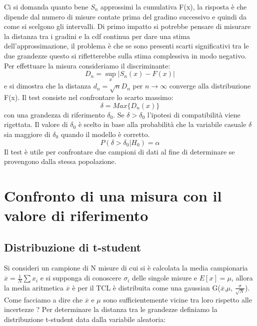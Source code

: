 \documentclass[11pt,a4paper]{book}
\begin{document}
Ci si domanda quanto bene $S_n$ approssimi la cumulativa F(x), la risposta \`{e} che dipende dal numero di misure contate prima del gradino successivo e quindi da come si scelgono gli intervalli. Di primo impatto si potrebbe pensare di misurare la distanza tra i gradini e la cdf continua per dare una stima dell'approssimazione, il problema \`{e} che se sono presenti scarti significativi tra le due grandezze questo si rifletterebbe sulla stima complessiva in modo negativo. Per effettuare la misura consideriamo il discriminante:
\begin{equation*}
	D_n = \sup_{x} \vert S_n(x) -F(x) \vert 
\end{equation*}
 e si dimostra che la distanza $d_n = \sqrt{n}D_n$ per $n \rightarrow \infty$ converge alla distribuzione F(x).
 Il test consiste nel confrontare lo scarto massimo:
 \begin{equation*}
 	\delta = Max \{D_n(x)\}
 \end{equation*}
 con una grandezza di riferimento $\delta_0$. Se $\delta > \delta_0$ l'ipotesi di compatibilit\`{a} viene rigettata. Il valore di $\delta_0$ \`{e} scelto in base alla probabilit\`{a} che la variabile casuale $\delta$ sia maggiore di $\delta_0$ quando il modello \`{e} corretto.
 \begin{equation*}
 	P(\delta > \delta_0 \vert H_0) = \alpha
 \end{equation*}
 Il test \`{e} utile per confrontare due campioni di dati al fine di determinare se provengono dalla stessa popolazione.
 
 \section{Confronto di una misura con il valore di riferimento}
 \subsection{Distribuzione di t-student}
 Si consideri un campione di N misure di cui si \`{e} calcolata la media campionaria $\overline{x} = \frac{1}{N} \sum x_i$ e si supponga di conoscere $\sigma_i$ delle singole misure e $E[x] = \mu$, allora la media aritmetica $\overline{x}$ \`{e} per il TCL \`{e} distribuita come una gaussian G($\overline{x}$,$\mu$, $\frac{\sigma}{\sqrt{N}}$). Come facciamo a dire che $\overline{x}$ e ${\mu}$ sono sufficientemente vicine tra loro rispetto alle incertezze ?
 \newline
 Per determinare la distanza tra le grandezze definiamo la distribuzione t-student data dalla variabile aleatoria:
 
\end{document}
